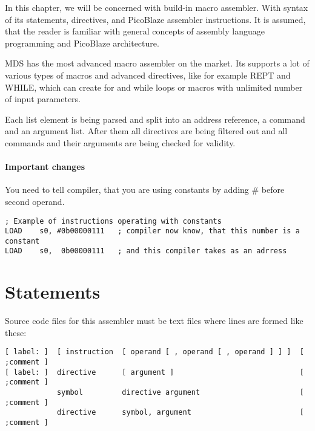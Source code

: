 In this chapter, we will be concerned with build-in macro assembler. With syntax of its statements, directives, and PicoBlaze assembler instructions. It is assumed, that the reader is familiar with general concepts of assembly language programming and PicoBlaze architecture.

MDS has the most advanced macro assembler on the market. Its supports a lot of various types of macros and advanced directives, like for example REPT and WHILE, which can create for and while loops or  macros with unlimited number of input parameters.

Each list element is being parsed and split into an address reference, a command and an argument list. After them all directives are being filtered out and all commands and their arguments are being checked for validity.

\paragraph{Important changes}
    You need to tell compiler, that you are using constants by adding \# before second operand.

    {
        \usecodefont
        \verb'; Example of instructions operating with constants'\\
        \verb'LOAD    s0, #0b00000111   ; compiler now know, that this number is a constant'\\
        \verb'LOAD    s0,  0b00000111   ; and this compiler takes as an adrress'\\
    }

\section{Statements}
    Source code files for this assembler must be text files where lines are formed like these:

    {
        \usecodefont
        \verb'[ label: ]  [ instruction  [ operand [ , operand [ , operand ] ] ]  [ ;comment ]'\\
        \verb'[ label: ]  directive      [ argument ]                             [ ;comment ]'\\
        \verb'            symbol         directive argument                       [ ;comment ]'\\
        \verb'            directive      symbol, argument                         [ ;comment ]'\\\\
    }

